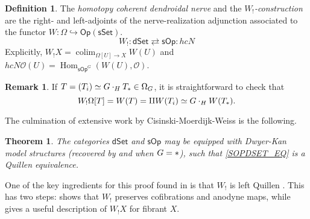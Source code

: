 \documentclass[a4paper,10pt
,draft
]{article}%
\numberwithin{equation}{section}
\numberwithin{figure}{section}
\newtheorem{theorem}[equation]{Theorem}%
\theoremstyle{definition} %
\newtheorem{definition}[equation]{Definition}%
\newtheorem{remark}[equation]{Remark}%
\newcommand{\into}{\hookrightarrow}%
\newcommand{\sSet}{\ensuremath{\mathsf{sSet}}}%
\newcommand{\Op}{\mathsf{Op}}%
\newcommand{\sOp}{\ensuremath{\mathsf{sOp}}}%
\newcommand{\dSet}{\mathsf{dSet}}
\DeclareMathOperator{\colim}{colim}%
\DeclareMathOperator{\Hom}{Hom}%
\renewcommand{\O}{\ensuremath{\mathcal O}}
\newcommand{\1}{\ensuremath{\mathbbm 1}}%
\begin{document}
\begin{definition}
      The \textit{homotopy coherent dendroidal nerve} and the \textit{$W_!$-construction}
      are the right- and left-adjoints of the nerve-realization adjunction associated to the functor $W: \Omega \into \Op(\sSet)$.
      \begin{equation}
            \label{SOPDSET_EQ}
            W_! \colon \dSet \rightleftarrows \sOp \colon h c N
      \end{equation}
      Explicitly, $W_!X = \colim_{\Omega[U] \to X}W(U)$ and $hcN\O(U) = \Hom_{\sOp^G}(W(U), \O)$. 
\end{definition}

\begin{remark}
      If $T = (T_i) \simeq G \cdot_H T_{\**} \in \Omega_G$, it is straightforward to check that
      \[
            W_!\Omega[T] = W(T) = \amalg W(T_i) \simeq G \cdot_H W(T_{\**}).
      \]
\end{remark}


The culmination of extensive work by Cisinski-Moerdijk-Weiss \cite{CM13a,CM13b,CM11,MW09,MW07} is the following.

\begin{theorem}
      \label{CMW_THM}
      The categories $\dSet$ and $\sOp$ may be equipped with Dwyer-Kan model structures
      (recovered by \cite[Thm. 2.1]{Per18} and \cite[Thm III]{BP_HGOP}  when $G = \**$),
      such that \eqref{SOPDSET_EQ} is a Quillen equivalence.
\end{theorem}


One of the key ingredients for this proof found in \cite{CM13b} is that $W_!$ is left Quillen \cite[Prop. 4.9]{CM13b}.
This has two steps:
\cite[Prop. 4.5]{CM13b} shows that $W_!$ preserves cofibrations and anodyne maps,
while \cite[Prop. 4.8]{CM13b} gives a useful description of $W_!X$ for fibrant $X$.
\end{document}
